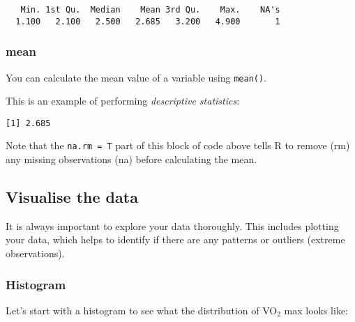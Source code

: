 \documentclass[
  letterpaper,
  DIV=11,
  numbers=noendperiod]{scrartcl}
\newenvironment{Shaded}{\begin{snugshade}}{\end{snugshade}}
\newcommand{\AttributeTok}[1]{\textcolor[rgb]{0.40,0.45,0.13}{#1}}
\newcommand{\DecValTok}[1]{\textcolor[rgb]{0.68,0.00,0.00}{#1}}
\newcommand{\FunctionTok}[1]{\textcolor[rgb]{0.28,0.35,0.67}{#1}}
\newcommand{\NormalTok}[1]{\textcolor[rgb]{0.00,0.23,0.31}{#1}}
\newcommand{\SpecialCharTok}[1]{\textcolor[rgb]{0.37,0.37,0.37}{#1}}
\newcommand{\StringTok}[1]{\textcolor[rgb]{0.13,0.47,0.30}{#1}}
\begin{document}
\begin{verbatim}
   Min. 1st Qu.  Median    Mean 3rd Qu.    Max.    NA's 
  1.100   2.100   2.500   2.685   3.200   4.900       1 
\end{verbatim}

\subsubsection{mean}\label{mean}

You can calculate the mean value of a variable using \texttt{mean()}.

This is an example of performing \emph{descriptive statistics}:

\begin{Shaded}
\end{Shaded}

\begin{verbatim}
[1] 2.685
\end{verbatim}

Note that the \texttt{na.rm\ =\ T} part of this block of code above
tells R to remove (rm) any missing observations (na) before calculating
the mean.

\subsection{Visualise the data}\label{visualise-the-data}

It is always important to explore your data thoroughly. This includes
plotting your data, which helps to identify if there are any patterns or
outliers (extreme observations).

\subsubsection{Histogram}\label{histogram}

Let's start with a histogram to see what the distribution of VO\(_2\)
max looks like:

\begin{Shaded}
\end{Shaded}
\end{document}
